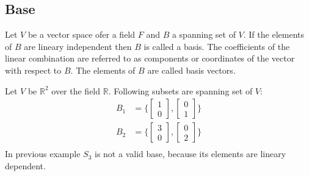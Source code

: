 \subsection{Base}
Let \(V\) be a vector space ofer a field \(F\) and \(B\) a spanning set of \(V\). If the elements of \(B\) are lineary independent then \(B\) is called a basis.
The coefficients of the linear combination are referred to as components or coordinates of the vector with respect to \(B\).
The elements of \(B\) are called basis vectors.
\begin{example}
    Let \(V\) be \(\mathbb{R}^2\) over the field \(\mathbb{R}\). Following subsets are spanning set of \(V\):
    \begin{align*}
        B_1 & = \{ \begin{bmatrix}
            1 \\ 0
        \end{bmatrix},
        \begin{bmatrix} 0 \\ 1 \end{bmatrix}
        \}                                     \\
        B_2 & = \{ \begin{bmatrix}
            3 \\ 0
        \end{bmatrix},
        \begin{bmatrix} 0 \\ 2 \end{bmatrix}
        \}                                     \\
    \end{align*}
    In previous example \(S_3\) is not a valid base, because its elements are lineary dependent.
\end{example}

